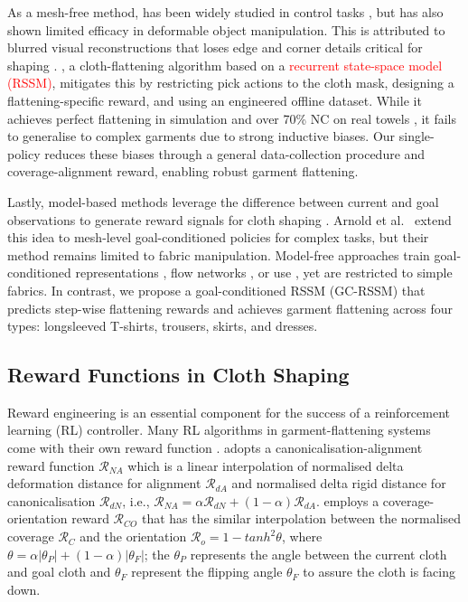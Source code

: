 \documentclass[journal]{IEEEtran}
\newcommand{\addtypo}[1]{\textcolor{red}{#1}}
\begin{document}
As a mesh-free method,  \cite{hafner2019learning} has been widely studied in control tasks \cite{yan2021learning, ma2021learning, lin2020softgym}, but has also shown limited efficacy in deformable object manipulation. This is attributed to blurred visual reconstructions that loses edge and corner details critical for shaping \cite{yan2021learning, hoque2022visuospatial, lin2022learning}.  \cite{kadi2024planet}, a cloth-flattening algorithm based on a \addtypo{recurrent state-space model (RSSM)}, mitigates this by restricting pick actions to the cloth mask, designing a flattening-specific reward, and using an engineered offline dataset. While it achieves perfect flattening in simulation and over 70\% NC on real towels \cite{kadi2024planet, kadi2025draper}, it fails to generalise to complex garments due to strong inductive biases. Our single-policy  reduces these biases through a general data-collection procedure and coverage-alignment reward, enabling robust garment flattening.

Lastly, model-based methods leverage the difference between current and goal observations to generate reward signals for cloth shaping \cite{hoque2022visuospatial, yan2021learning}. Arnold et al.~\cite{arnold2023cloth} extend this idea to mesh-level goal-conditioned policies for complex tasks, but their method remains limited to fabric manipulation. Model-free approaches train goal-conditioned representations \cite{mo2022foldsformer}, flow networks \cite{weng2022fabricflownet}, or use  \cite{andrychowicz2017hindsight, lee2021learning}, yet are restricted to simple fabrics. In contrast, we propose a goal-conditioned RSSM (GC-RSSM) that predicts step-wise flattening rewards and achieves garment flattening across four types: longsleeved T-shirts, trousers, skirts, and dresses.




\subsection{Reward Functions in Cloth Shaping} \label{sec:reward-literature}
Reward engineering is an essential component for the success of a reinforcement learning (RL) controller. Many RL algorithms in garment-flattening systems come with their own reward function \cite{canberk2023cloth, gu2023learning, avigal2022speedfolding}.  \cite{canberk2023cloth} adopts a canonicalisation-alignment reward  function $\mathcal{R}_{NA}$  which is a linear interpolation of normalised delta deformation distance for alignment $\mathcal{R}_{dA}$ and normalised delta rigid distance for canonicalisation $\mathcal{R}_{dN}$, i.e., $\mathcal{R}_{NA} = \alpha\mathcal{R}_{dN} + (1-\alpha)\mathcal{R}_{dA}$.  \cite{gu2023learning} employs a coverage-orientation reward $\mathcal{R}_{CO}$ that has the similar interpolation between the normalised coverage $\mathcal{R}_C$ and the orientation $\mathcal{R}_o = 1 - tanh^2\theta$, where $\theta = \alpha|\theta_P| + (1-\alpha)|\theta_F|$; the $\theta_P$ represents the angle between the current cloth and goal cloth and $\theta_F$ represent the flipping angle $\theta_F$ to assure the cloth is facing down. 
\end{document}
